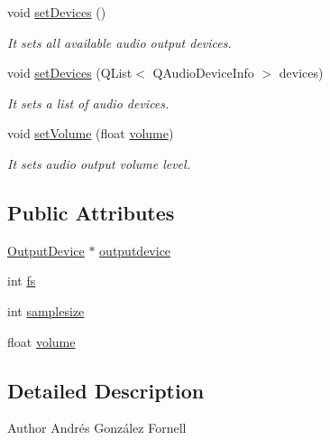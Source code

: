 \begin{DoxyCompactItemize}
\mbox{\label{class_audio_output_a5b8fb2dfc8057c8195c192ae65820821}} 
void \hyperlink{class_audio_output_a5b8fb2dfc8057c8195c192ae65820821}{set\+Devices} ()
\begin{DoxyCompactList}\small\item\em It sets all available audio output devices. \end{DoxyCompactList}\item 
void \hyperlink{class_audio_output_a27ada29ff74a99f5c21d949caba261ee}{set\+Devices} (Q\+List$<$ Q\+Audio\+Device\+Info $>$ devices)
\begin{DoxyCompactList}\small\item\em It sets a list of audio devices. \end{DoxyCompactList}\item 
void \hyperlink{class_audio_output_a97008d6a17c3dc03c64e421f563e04b8}{set\+Volume} (float \hyperlink{class_audio_output_a16937c9086904959b06b77326032aa72}{volume})
\begin{DoxyCompactList}\small\item\em It sets audio output volume level. \end{DoxyCompactList}\end{DoxyCompactItemize}
\subsection*{Public Attributes}
\begin{DoxyCompactItemize}
\item 
\hyperlink{class_output_device}{Output\+Device} $\ast$ \hyperlink{class_audio_output_aa3e000199604f972e59242fb15a6707e}{outputdevice}
\item 
int \hyperlink{class_audio_output_ac2a46ded8a978627b8af81458a714ef3}{fs}
\item 
int \hyperlink{class_audio_output_aac9c297a839bb25c1232fc5adcce6cab}{samplesize}
\item 
float \hyperlink{class_audio_output_a16937c9086904959b06b77326032aa72}{volume}
\end{DoxyCompactItemize}


\subsection{Detailed Description}
\begin{DoxyAuthor}{Author}
Andrés González Fornell 
\end{DoxyAuthor}


